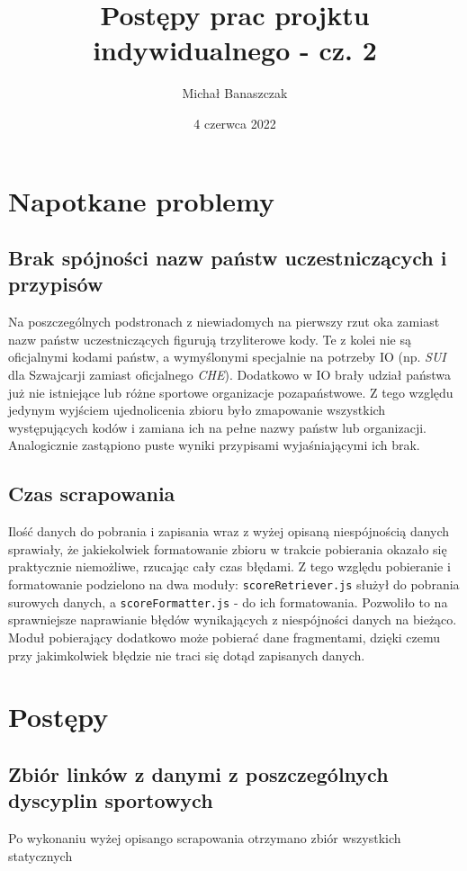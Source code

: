 \documentclass[a4paper,11pt]{article}
\title{Postępy prac projktu indywidualnego - cz. 2}
\author{Michał Banaszczak}
\date{4 czerwca 2022}
\begin{document}
\maketitle

\section{Napotkane problemy}
\subsection{Brak spójności nazw państw uczestniczących i przypisów}
Na poszczególnych podstronach z niewiadomych na pierwszy rzut oka zamiast nazw
państw uczestniczących figurują trzyliterowe kody. Te z kolei nie są oficjalnymi
kodami państw, a wymyślonymi specjalnie na potrzeby IO (np. \textit{SUI} dla
Szwajcarji zamiast oficjalnego \textit{CHE}). Dodatkowo w IO brały udział państwa
już nie istniejące lub różne sportowe organizacje pozapaństwowe. Z tego względu
jedynym wyjściem ujednolicenia zbioru było zmapowanie wszystkich występujących
kodów i zamiana ich na pełne nazwy państw lub organizacji. Analogicznie zastąpiono
puste wyniki przypisami wyjaśniającymi ich brak.

\subsection{Czas scrapowania}
Ilość danych do pobrania i zapisania wraz z wyżej opisaną niespójnością danych
sprawiały, że jakiekolwiek formatowanie zbioru w trakcie pobierania okazało się
praktycznie niemożliwe, rzucając cały czas błędami. Z tego względu pobieranie 
i formatowanie podzielono na dwa moduły: \verb|scoreRetriever.js| służył do
pobrania surowych danych, a \verb|scoreFormatter.js| - do ich formatowania.
Pozwoliło to na sprawniejsze naprawianie błędów wynikających z niespójności danych
na bieżąco. Moduł pobierający dodatkowo może pobierać dane fragmentami, dzięki
czemu przy jakimkolwiek błędzie nie traci się dotąd zapisanych danych. 

\section{Postępy}
\subsection{Zbiór linków z danymi z poszczególnych dyscyplin sportowych}
Po wykonaniu wyżej opisango scrapowania otrzymano zbiór wszystkich statycznych
\end{document}
